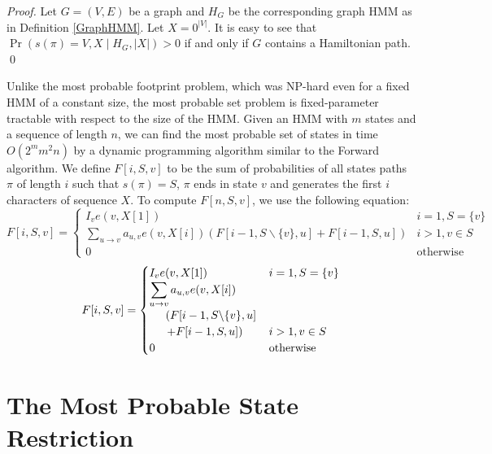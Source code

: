 \begin{reformulate*}
\begin{proof}
Let $G=(V,E)$ be a graph  
and $H_G$ be the corresponding graph HMM as
in Definition \ref{GraphHMM}. Let $X=0^{|V|}$.  
It is easy to see that $\Pr\left(s(\pi)=V,X \mid H_G, |X|
\right)>0$ if and only if $G$ contains a Hamiltonian path. \qed
\end{proof}

Unlike the most probable footprint problem, which was NP-hard even for
a fixed HMM of a constant size, the most probable set problem is
fixed-parameter tractable with respect to the size of the HMM. Given
an HMM with $m$ states and a sequence of length $n$, we can find the
most probable set of states in time $O(2^m m^2 n)$ by a dynamic
programming algorithm similar to the Forward algorithm.
We define $F[i,S,v]$ to be the sum of probabilities of all
states paths $\pi$ of length $i$ such that $s(\pi)=S$, $\pi$ ends in
state $v$ and generates the first $i$ characters of sequence $X$.
To compute $F[n,S,v]$, we use the following equation:
\ifx\settwocolumn\undefined
$$F[i,S,v] = \begin{cases}
I_{v}e(v,X[1])& i=1,S=\{v\}\\ 
\displaystyle \sum_{u\to v}a_{u,v}e(v,X[i])\left(F[i-1,S\backslash\{v\},u]
+ F[i-1,S,u]\right) & i>1, v\in S\\
0 & \mbox{otherwise}
\end{cases}$$
\else
$$F[i,S,v] = \begin{cases}
I_{v}e(v,X[1])& i=1,S=\{v\}\\ 
\displaystyle \sum_{u\to v}a_{u,v}e(v,X[i])\\\hspace{5mm}\left(F[i-1,S\backslash\{v\},u]\right.
\\\hspace{5mm}\left.
+ F[i-1,S,u]\right) & i>1, v\in S\\
0 & \mbox{otherwise}
\end{cases}$$
\fi


\end{reformulate*}


\section{The Most Probable State Restriction}

